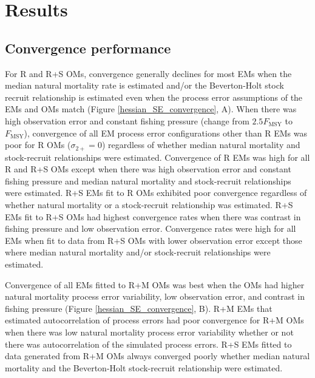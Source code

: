 \documentclass[
  12pt,
]{article}
\begin{document}
\hypertarget{results}{%
\section*{Results}\label{results}}

\hypertarget{convergence-performance}{%
\subsection*{Convergence performance}\label{convergence-performance}}

For R and R+S OMs, convergence generally declines for most EMs when the
median natural mortality rate is estimated and/or the Beverton-Holt
stock recruit relationship is estimated even when the process error
assumptions of the EMs and OMs match (Figure
\ref{hessian_SE_convergence}, A). When there was high observation error
and constant fishing pressure (change from \(2.5F_{\text{MSY}}\) to
\(F_{\text{MSY}}\)), convergence of all EM process error configurations
other than R EMs was poor for R OMs (\(\sigma_{2+} = 0\)) regardless of
whether median natural mortality and stock-recruit relationships were
estimated. Convergence of R EMs was high for all R and R+S OMs except
when there was high observation error and constant fishing pressure and
median natural mortality and stock-recruit relationships were estimated.
R+S EMs fit to R OMs exhibited poor convergence regardless of whether
natural mortality or a stock-recruit relationship was estimated. R+S EMs
fit to R+S OMs had highest convergence rates when there was contrast in
fishing pressure and low observation error. Convergence rates were high
for all EMs when fit to data from R+S OMs with lower observation error
except those where median natural mortality and/or stock-recruit
relationships were estimated.

Convergence of all EMs fitted to R+M OMs was best when the OMs had
higher natural mortality process error variability, low observation
error, and contrast in fishing pressure (Figure
\ref{hessian_SE_convergence}, B). R+M EMs that estimated autocorrelation
of process errors had poor convergence for R+M OMs when there was low
natural mortality process error variability whether or not there was
autocorrelation of the simulated process errors. R+S EMs fitted to data
generated from R+M OMs always converged poorly whether median natural
mortality and the Beverton-Holt stock-recruit relationship were
estimated.
\end{document}
